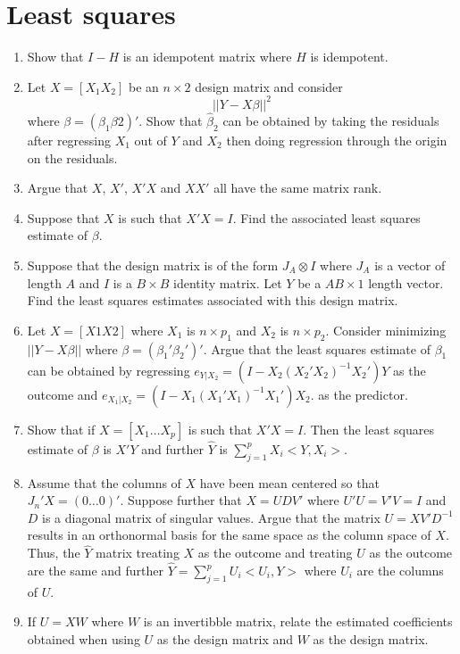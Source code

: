 \documentclass[12pt]{article}
\begin{document}
\section{Least squares}
\begin{enumerate}[1.]
\item Show that $I - H$ is an idempotent matrix where $H$ is idempotent.
\item Let $X = [X_1 X_2]$ be an $n\times 2$ design matrix and consider 
$$|| Y - X \beta ||^2$$ where $\beta = (\beta_1 \beta2)'$. Show
that $\hat \beta_2$ can be obtained by taking the residuals after
regressing $X_1$ out of $Y$ and $X_2$ then doing regression through
the origin on the residuals.
\item Argue that $X$, $X'$, $X'X$ and $XX'$ all have the same matrix rank.
\item Suppose that $X$ is such that $X'X = I$. Find the associated least
squares estimate of $\beta$.
\item Suppose that the design matrix is of the form $J_A \otimes I$ where
$J_A$ is a vector of length $A$ and $I$ is a $B\times B$ identity matrix. 
Let $Y$ be a $AB \times 1$ length vector. Find the least squares estimates
associated with this design matrix.
\item Let $X = [X1 X2]$ where $X_1$ is $n\times p_1$ and $X_2$ is $n\times p_2$.
Consider minimizing $|| Y - X \beta ||$ where $\beta = (\beta_1' \beta_2')'$. 
Argue that the least squares estimate of $\beta_1$ can be obtained by 
regressing $e_{Y | X_2} = (I - X_2 (X_2' X_2)^{-1} X_2') Y$ as the outcome
and $e_{X_1 | X_2} = (I - X_1 (X_1 ' X_1)^{-1} X_1')X_2$. as the predictor.
\item Show that if $X = [X_1 \ldots X_p]$ is such that $X'X = I$. Then
the least squares estimate of $\beta$ is $X' Y$ and further $\hat Y$
is $\sum_{j = 1}^p X_i <Y, X_i>$. 
\item Assume that the columns of $X$ have been mean centered so that
$J_n' X = (0 \ldots 0)'$. Suppose further that $X = U D V'$ where $U'U = V'V = I$ and $D$ is a
diagonal matrix of singular values. Argue that the matrix $U = X V' D^{-1}$ results in an orthonormal
basis for the same space as the column space of $X$. Thus, the $\hat Y$ matrix treating
$X$ as the outcome and treating $U$ as the outcome are the same and further
$\hat Y = \sum_{j=1}^p U_i <U_i, Y>$ where $U_i$ are the columns of $U$.
\item If $U=XW$ where $W$ is an invertibble matrix, relate the estimated coefficients
obtained when using $U$ as the design matrix and $W$ as the design matrix.
\end{enumerate}
\end{document}
